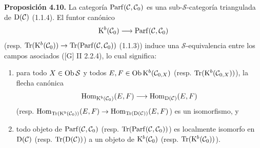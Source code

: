 
\providecommand{\sisi}[2]{#2}

\textbf{Proposición 4.10.} La categoría \(\operatorname{Parf}(\mathcal C,\mathcal C_0)\) es una sub-\(\sisi{S}{\mathcal S}\)-categoría triangulada de \(\mathrm D(\mathcal C)\) (1.1.4). El funtor canónico
\[
  \mathrm K^b(\mathcal C_0)\longrightarrow\operatorname{Parf}(\mathcal C,\mathcal C_0)
\]
(resp. \(\operatorname{Tr}(\mathrm K^b(\mathcal C_0))\to\operatorname{Tr}(\operatorname{Parf}(\mathcal C,\mathcal C_0))\) (1.1.3)) induce una \(\sisi{S}{\mathcal S}\)-equivalencia entre los campos asociados ([G] II 2.2.4), lo cual significa:
\begin{enumerate}[label=(\roman*)]
\item para todo \(X\in\Ob \sisi{S}{\mathcal S}\) y todos \(E,F\in\operatorname{Ob}\mathrm K^b(\mathcal C_{0,X})\) (resp. \(\operatorname{Tr}(\mathrm K^b(\mathcal C_{0,X}))\)), la flecha canónica
\[
  \operatorname{Hom}_{\mathrm K^b(\mathcal C_0)}(E,F)
  \longrightarrow
  \operatorname{Hom}_{\mathrm D(\mathcal C)}(E,F)
\]
(resp. \(\operatorname{Hom}_{\operatorname{Tr}(\mathrm K^b(\mathcal C_0))}(E,F)\to\operatorname{Hom}_{\operatorname{Tr}(\mathrm D(\mathcal C))}(E,F)\)) es un isomorfismo, y
\item todo objeto de \(\operatorname{Parf}(\mathcal C,\mathcal C_0)\) (resp. \(\operatorname{Tr}(\operatorname{Parf}(\mathcal C,\mathcal C_0))\)) es localmente isomorfo en \(\mathrm D(\mathcal C)\) (resp. \(\operatorname{Tr}(\mathrm D(\mathcal C))\)) a un objeto de \(\mathrm K^b(\mathcal C_0)\) (resp. \(\operatorname{Tr}(\mathrm K^b(\mathcal C_0))\)).
\end{enumerate}


